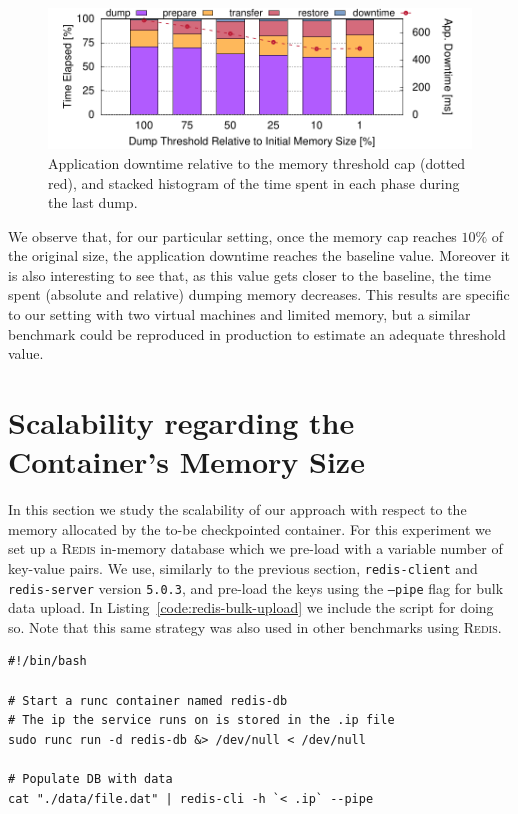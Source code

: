 \begin{figure}[h!]
    \centering
    \includegraphics[width=\textwidth]{./figs/downtime/downtime.pdf}
    \caption[Application Downtime Relative to Threshold]{Application downtime
        relative to the memory threshold cap (dotted red), and stacked
        histogram of the
        time spent in each phase during the last dump.\label{fig:downtime}}
\end{figure}

We observe that, for our particular setting, once the memory cap reaches $10\%$
of the original size, the application downtime reaches the baseline value.
Moreover it is also interesting to see that, as this value gets closer to the
baseline, the time spent (absolute and relative) dumping memory decreases.
This results are specific to our setting with two virtual machines and limited
memory, but a similar benchmark could be reproduced in production to estimate
an adequate threshold value.

\section{Scalability regarding the Container's Memory Size}
\label{sec:eval-memory}

In this section we study the scalability of our approach with respect to the
memory allocated by the to-be checkpointed container.
For this experiment we set up a \textsc{Redis} in-memory database which we
pre-load with a variable number of key-value pairs.
We use, similarly to the previous section, \texttt{redis-client} and
\texttt{redis-server} version \texttt{5.0.3}, and pre-load the keys using the
\texttt{--pipe} flag for bulk data upload.
In Listing~\ref{code:redis-bulk-upload} we include the script for doing so.
Note that this same strategy was also used in other benchmarks using
\textsc{Redis}.
\begin{lstlisting}[style=Bash,caption={Snippet for bulk data upload to a Redis database.},label={code:redis-bulk-upload}]
#!/bin/bash

# Start a runc container named redis-db
# The ip the service runs on is stored in the .ip file
sudo runc run -d redis-db &> /dev/null < /dev/null

# Populate DB with data
cat "./data/file.dat" | redis-cli -h `< .ip` --pipe
\end{lstlisting}

